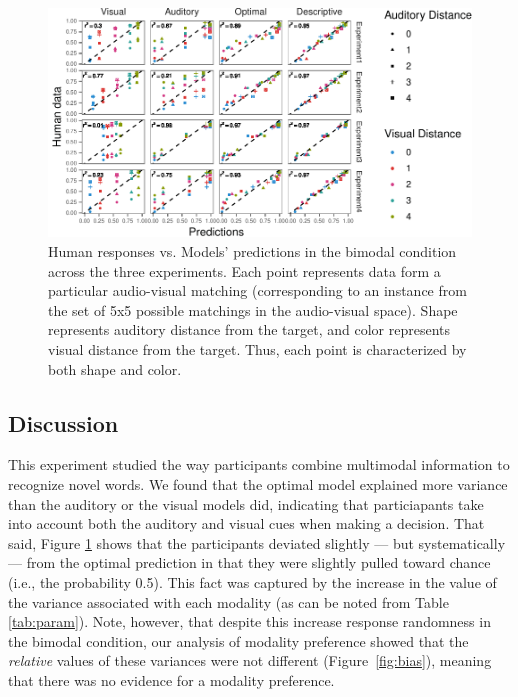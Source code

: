 \documentclass[english,,man,floatsintext]{apa6}
\theoremstyle{definition}
\theoremstyle{definition}
\theoremstyle{definition}
\theoremstyle{remark}
\begin{document}
\begin{figure}[!h]
\includegraphics[width=\textwidth]{ms_files/figure-latex/bimodal-1} \caption{Human responses vs. Models' predictions in the bimodal condition across the three experiments. Each point represents data form a particular audio-visual matching (corresponding to an instance from the set of 5x5 possible matchings in the audio-visual space). Shape represents auditory distance from the target, and color represents visual distance from the target. Thus, each point is characterized by both  shape and color.}\label{fig:bimodal}
\end{figure}

\subsection{Discussion}\label{discussion}

This experiment studied the way participants combine multimodal
information to recognize novel words. We found that the optimal model
explained more variance than the auditory or the visual models did,
indicating that particiapants take into account both the auditory and
visual cues when making a decision. That said, Figure \ref{fig:bimodal}
shows that the participants deviated slightly --- but systematically---
from the optimal prediction in that they were slightly pulled toward
chance (i.e., the probability 0.5). This fact was captured by the
increase in the value of the variance associated with each modality (as
can be noted from Table \ref{tab:param}). Note, however, that despite
this increase response randomness in the bimodal condition, our analysis
of modality preference showed that the \emph{relative} values of these
variances were not different (Figure~\ref{fig:bias}), meaning that there
was no evidence for a modality preference.
\end{document}
